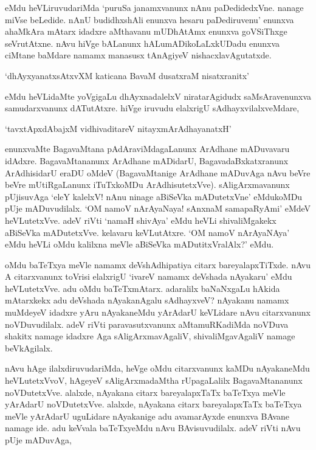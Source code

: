 \noindent eMdu heVLiruvudariMda `puruSa janamxvanunx nAnu paDedidedxVne. nanage miVse beLedide. nAnU budidhxshAli enunxva hesaru paDediruvenu' enunxva ahaMkAra mAtarx idadxre aMthavanu mUDhAtAmx enunxva goVSiThxge seVrutAtxne. nAvu hiVge bALanunx hALumADikoLaLxkUDadu enunxva ciMtane baMdare namamx manasusx tAnAgiyeV nishacxlavAgutatxde.

\begin{shloka}
`dhAyxyanatxsAtxvXM katicana BavaM dusatxraM nisatxranitx'
\end{shloka}

\noindent eMdu heVLidaMte yoVgigaLu dhAyxnadalelxV niratarAgidudx saMsAravenunxva samudarxvanunx dATutAtxre. hiVge iruvudu elalxrigU sAdhayxvilalxveMdare,

\begin{shloka}
`tavxtApxdAbajxM vidhivaditareV nitayxmArAdhayanatxH'
\end{shloka}

\noindent enunxvaMte BagavaMtana pAdAraviMdagaLanunx ArAdhane mADuvavaru idAdxre. BagavaMtananunx ArAdhane mADidarU, BagavadaBxkatxranunx ArAdhisidarU eraDU oMdeV (BagavaMtanige ArAdhane mADuvAga nAvu beVre beVre mUtiRgaLanunx iTuTxkoMDu ArAdhisutetxVve). sAligArxmavanunx pUjisuvAga `eleY kalelxV! nAnu ninage aBiSeVka mADutetxVne' eMdukoMDu pUje mADuvudilalx. `OM namoV nArAyaNaya! sAnxnaM samapaRyAmi' eMdeV heVLutetxVve. adeV riVti `namaH shivAya' eMdu heVLi shivaliMgakekx aBiSeVka mADutetxVve. kelavaru keVLutAtxre. `OM namoV nArAyaNAya' eMdu heVLi oMdu kalilxna meVle aBiSeVka mADutitxVralAlx?' eMdu.

oMdu baTeTxya meVle namamx deVshAdhipatiya citarx bareyalapxTiTxde. nAvu A citarxvanunx toVrisi elalxrigU `ivareV namamx deVshada nAyakaru' eMdu heVLutetxVve. adu oMdu baTeTxmAtarx. adaralilx baNaNxgaLu hAkida mAtarxkekx adu deVshada nAyakanAgalu sAdhayxveV? nAyakanu namamx muMdeyeV idadxre yAru nAyakaneMdu yArAdarU keVLidare nAvu citarxvanunx noVDuvudilalx. adeV riVti paravasutxvanunx aMtamuRKadiMda noVDuva shakitx namage idadxre Aga sAligArxmavAgaliV, shivaliMgavAgaliV namage beVkAgilalx.

nAvu hAge ilalxdiruvudariMda, heVge oMdu citarxvanunx kaMDu nAyakaneMdu heVLutetxVvoV, hAgeyeV sAligArxmadaMtha rUpagaLalilx BagavaMtananunx noVDutetxVve. alalxde, nAyakana citarx bareyalapxTaTx baTeTxya meVle yArAdarU noVDutetxVve. alalxde, nAyakana citarx bareyalapxTaTx baTeTxya meVle yArAdarU uguLidare nAyakanige adu avamarAyxde enunxva BAvane namage ide. adu keVvala baTeTxyeMdu nAvu BAvisuvudilalx. adeV riVti nAvu pUje mADuvAga,

